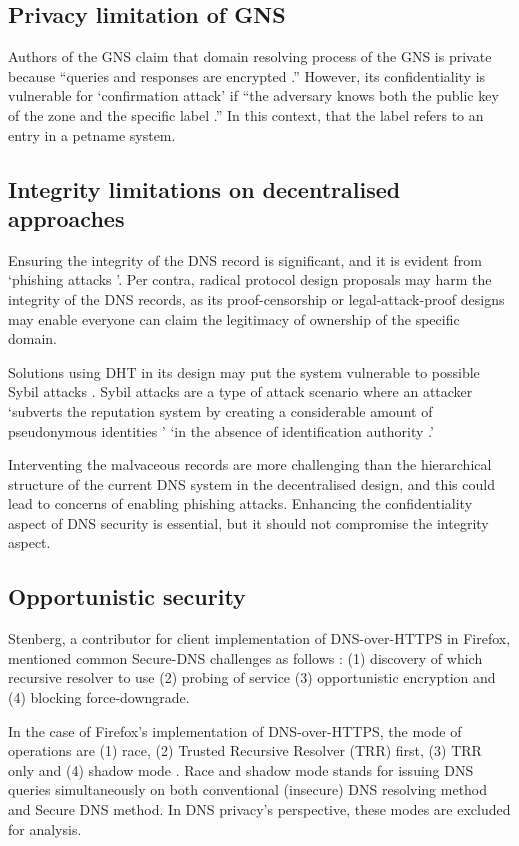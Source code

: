\subsection{Privacy limitation of GNS}
Authors of the GNS claim that domain resolving process of the GNS is private because ``queries and responses are encrypted \cite{grothoff2017nsa, wachs2014censorship}.''
However, its confidentiality is vulnerable for `confirmation attack' if ``the adversary knows both the public key of the zone and the specific label \cite{wachs2014censorship}.'' In this context, that the label refers to an entry in a petname system. 

\subsection{Integrity limitations on decentralised approaches}
Ensuring the integrity of the DNS record is significant, and it is evident from `phishing attacks \cite{ariyapperuma2007security, ollmann2004phishing}'.
Per contra, radical protocol design proposals may harm the integrity of the DNS records, as its proof-censorship or legal-attack-proof designs may enable everyone can claim the legitimacy of ownership of the specific domain.

Solutions using DHT in its design may put the system vulnerable to possible Sybil attacks \cite{6503215, SitE2002Scfp}.
Sybil attacks are a type of attack scenario where an attacker `subverts the reputation system by creating a considerable amount of pseudonymous identities \cite{TRIFA20141135}' `in the absence of identification authority \cite{douceur2002sybil}.'

Interventing the malvaceous records are more challenging than the hierarchical structure of the current DNS system in the decentralised design, and this could lead to concerns of enabling phishing attacks.
Enhancing the confidentiality aspect of DNS security is essential, but it should not compromise the integrity aspect.

\subsection{Opportunistic security}
Stenberg, a contributor for client implementation of DNS-over-HTTPS in Firefox, mentioned common Secure-DNS challenges as follows \cite{daniel-doh}: (1) discovery of which recursive resolver to use (2) probing of service (3) opportunistic encryption and (4) blocking force-downgrade.

In the case of Firefox's implementation of DNS-over-HTTPS, the mode of operations are (1) race, (2) Trusted Recursive Resolver (TRR) first, (3) TRR only and (4) shadow mode \cite{firefox-doh-engine}.
Race and shadow mode stands for issuing DNS queries simultaneously on both conventional (insecure) DNS resolving method and Secure DNS method.
In DNS privacy's perspective, these modes are excluded for analysis.

